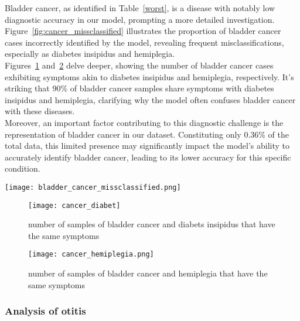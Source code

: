 Bladder cancer, as identified in Table~\ref{worst}, is a disease with notably low diagnostic accuracy in our model,
prompting a more detailed investigation. Figure~\ref{fig:cancer_missclassified}
illustrates the proportion of bladder cancer cases incorrectly identified by the model, revealing frequent misclassifications,
especially as diabetes insipidus and hemiplegia.\\
Figures~\ref{fig:cancer_diabet} and~\ref{fig:caner_hemiplegia} delve deeper, showing the number of bladder cancer cases exhibiting
symptoms akin to diabetes insipidus and hemiplegia, respectively. It's striking that 90\% of bladder cancer samples share
symptoms with diabetes insipidus and hemiplegia, clarifying why the model often confuses bladder cancer with these diseases.\\
Moreover, an important factor contributing to this diagnostic challenge is the representation of bladder cancer in our dataset.
Constituting only 0.36\% of the total data, this limited presence may significantly impact the model's ability to accurately identify bladder cancer,
leading to its lower accuracy for this specific condition.
\begin{figure*}[htbp]
	\centering
	\texttt{[image: bladder\_cancer\_missclassified.png]}
	\caption{Percentage of bladder cancer samples misclassified}\label{fig:cancer_missclassified}
\end{figure*}
\noindent

\begin{figure}[h]
	\centering
	\texttt{[image: cancer\_diabet]}
	\caption{number of samples of bladder cancer and diabets insipidus that have the same symptoms}\label{fig:cancer_diabet}
\end{figure}
\noindent

\begin{figure}[h]
	\centering
	\texttt{[image: cancer\_hemiplegia.png]}
	\caption{number of samples of bladder cancer and hemiplegia that have the same symptoms}\label{fig:caner_hemiplegia}
\end{figure}
\noindent

\subsubsection*{Analysis of otitis}


